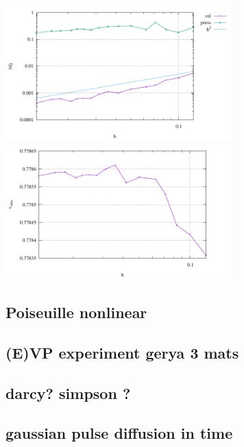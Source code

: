 \documentclass[a4paper]{article}
\begin{document}
\begin{center}
\includegraphics[width=8.7cm]{./results/benchmark_solvi/convergence.pdf}
\includegraphics[width=8.7cm]{./results/benchmark_solvi/vrms.pdf}
\end{center}



\subsection{Poiseuille nonlinear}

\subsection{(E)VP experiment gerya 3 mats}

\subsection{darcy? simpson ?}

\subsection{gaussian pulse diffusion in time}






\newpage
\printbibliography
\end{document}
